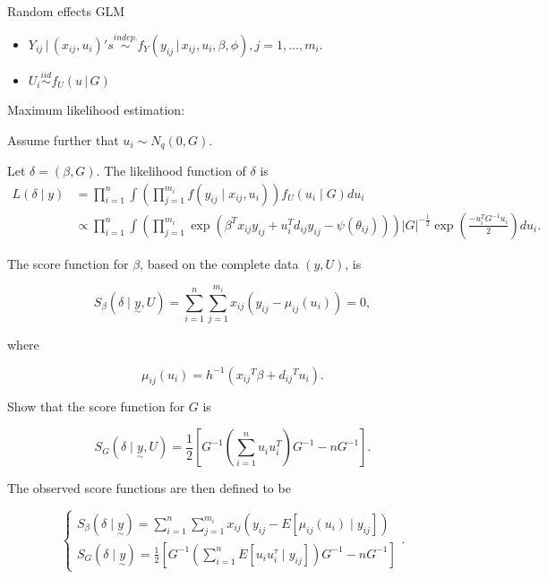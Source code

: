 \documentclass[UTF8,a4paper,10pt]{article}
\begin{document}





Random effects GLM

\begin{itemize}
  \item \(Y_{ij}\,|\,(x_{ij},u_i)'s \overset{indep.}{\sim}f_Y(y_{ij}\,|\,x_{ij},u_{i},\beta,\phi),j = 1,\ldots,m_i.\)
  \item \(U_i\overset{iid}{\sim}f_{U}(u\,|\,G)\)
\end{itemize}

\begin{Problem}[]{Maximum likelihood estimation:}
  
  Assume further that $u_i \sim N_q(0, G)$.

  Let $\delta=(\beta, G)$. The likelihood function of $\delta$ is
  $$
  \begin{aligned}
  L(\delta \mid y) & =\prod_{i=1}^n \int\left(\prod_{j=1}^{m_i} f\left(y_{i j} \mid x_{i j}, u_i\right)\right) f_U\left(u_i \mid G\right) d u_i \\
  & \propto \prod_{i=1}^n \int\left(\prod_{j=1}^{m_i} \exp \left(\beta^T x_{i j} y_{i j}+u_i^T d_{i j} y_{i j}-\psi\left(\theta_{i j}\right)\right)\right)|G|^{-\frac{1}{2}} \exp \left(\frac{-u_i^T G^{-1} u_i}{2}\right) d u_i .
  \end{aligned}
  $$
  
  The score function for $\beta$, based on the complete data $(y, U)$, is

  \[S_\beta(\delta \mid \underset{\sim}{y}, U)=\sum_{i=1}^n \sum_{j=1}^{m_i} x_{i j}\left(y_{i j}-\mu_{i j}\left(u_i\right)\right)=0,\] 
  
  where 
  
  \[\mu_{i j}\left(u_i\right)=h^{-1}\left(x_{i j}{ }^T \beta+d_{i j}{ }^T u_i\right).\]


Show that the score function for $G$ is 
  
  \[S_G(\delta \mid \underset{\sim}{y}, U)=\frac{1}{2}\left[G^{-1}\left(\sum_{i=1}^n u_i u_i^T\right) G^{-1}-n G^{-1}\right].\]

  The observed score functions are then defined to be


  $$
  \left\{\begin{array}{l}
  S_\beta(\delta \mid \underset{\sim}{y})=\sum_{i=1}^n \sum_{j=1}^{m_i} x_{i j}\left(y_{i j}-E\left[\mu_{i j}\left(u_i\right) \mid y_{i j}\right]\right) \\
  S_G(\delta \mid \underset{\sim}{y})=\frac{1}{2}
  \left[G^{-1} \left(\sum_{i=1}^n E\left[u_i u_i^\tau \mid y_{i j}\right]\right) G^{-1}-n G^{-1}\right]
  \end{array} .\right.
  $$
  

\end{Problem}
\end{document}
